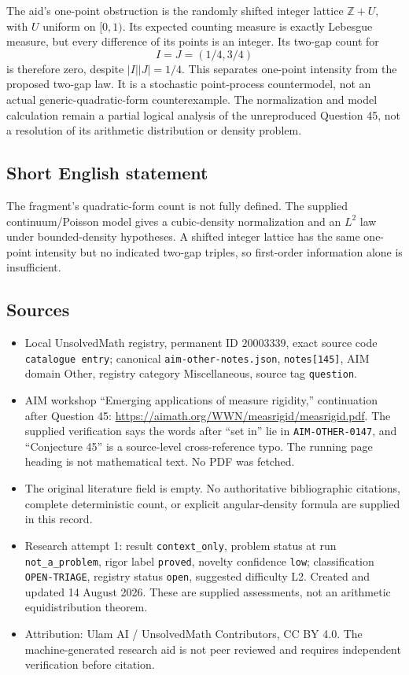 \documentclass[11pt]{article}
\newcommand{\Z}{\mathbb{Z}}
\begin{document}
The aid's one-point obstruction is the randomly shifted integer lattice \(\Z+U\), with \(U\) uniform on \([0,1)\). Its expected counting measure is exactly Lebesgue measure, but every difference of its points is an integer. Its two-gap count for
\[
 I=J=(1/4,3/4)
\]
is therefore zero, despite \(|I||J|=1/4\). This separates one-point intensity from the proposed two-gap law. It is a stochastic point-process countermodel, not an actual generic-quadratic-form counterexample. The normalization and model calculation remain a partial logical analysis of the unreproduced Question 45, not a resolution of its arithmetic distribution or density problem.
\subsection{Short English statement}
The fragment's quadratic-form count is not fully defined. The supplied continuum/Poisson model gives a cubic-density normalization and an \(L^2\) law under bounded-density hypotheses. A shifted integer lattice has the same one-point intensity but no indicated two-gap triples, so first-order information alone is insufficient.
\subsection{Sources}
\begin{itemize}
\item Local UnsolvedMath registry, permanent ID \(20003339\), exact source code \texttt{catalogue entry}; canonical \texttt{aim-other-notes.json}, \texttt{notes[145]}, AIM domain Other, registry category Miscellaneous, source tag \texttt{question}.
\item AIM workshop ``Emerging applications of measure rigidity,'' continuation after Question 45: \url{https://aimath.org/WWN/measrigid/measrigid.pdf}. The supplied verification says the words after ``set in'' lie in \texttt{AIM-OTHER-0147}, and ``Conjecture 45'' is a source-level cross-reference typo. The running page heading is not mathematical text. No PDF was fetched.
\item The original literature field is empty. No authoritative bibliographic citations, complete deterministic count, or explicit angular-density formula are supplied in this record.
\item Research attempt 1: result \texttt{context\_only}, problem status at run \texttt{not\_a\_problem}, rigor label \texttt{proved}, novelty confidence \texttt{low}; classification \texttt{OPEN-TRIAGE}, registry status \texttt{open}, suggested difficulty L2. Created and updated 14 August 2026. These are supplied assessments, not an arithmetic equidistribution theorem.
\item Attribution: Ulam AI / UnsolvedMath Contributors, CC BY 4.0. The machine-generated research aid is not peer reviewed and requires independent verification before citation.
\end{itemize}
\end{document}
